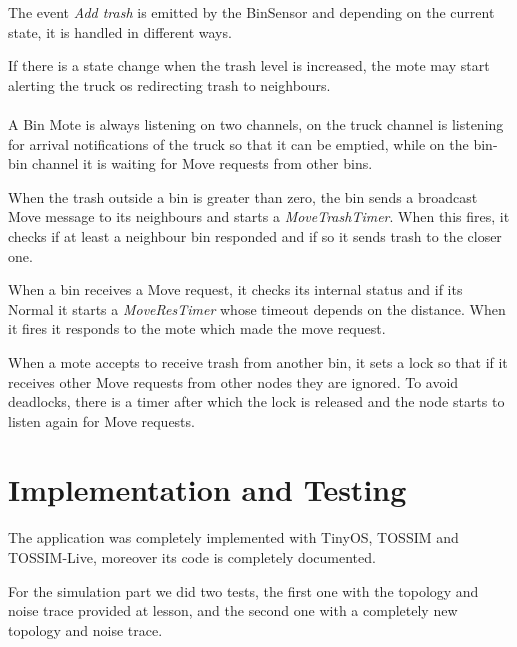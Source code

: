 \documentclass[a4paper,12pt,notitlepage]{report}
\begin{document}
The event \emph{Add trash} is emitted by the BinSensor and depending on the current state, it is handled in different ways.

If there is a state change when the trash level is increased, the mote may start alerting the truck os redirecting trash to neighbours.
\\\\
A Bin Mote is always listening on two channels, on the truck channel is listening for arrival notifications of the truck so that it can be emptied,
while on the bin-bin channel it is waiting for Move requests from other bins.

When the trash outside a bin is greater than zero, the bin sends a broadcast Move message to its neighbours and starts a \emph{MoveTrashTimer}. When this fires, it checks if at least a
neighbour bin responded and if so it sends trash to the closer one.

When a bin receives a Move request, it checks its internal status and if its Normal it starts a \emph{MoveResTimer} whose timeout depends on the distance. When it fires it responds to the mote which made the move request.

When a mote accepts to receive trash from another bin, it sets a lock so that if it receives other Move requests from other nodes they are ignored. To avoid deadlocks, there is a timer after which the lock is released and the node starts to listen again for Move requests.

\section*{Implementation and Testing}
The application was completely implemented with TinyOS, TOSSIM and TOSSIM-Live, moreover its code is completely documented.

For the simulation part we did two tests, the first one with the topology and noise trace provided at lesson, and the second one with a completely new topology and noise trace.
\end{document}
